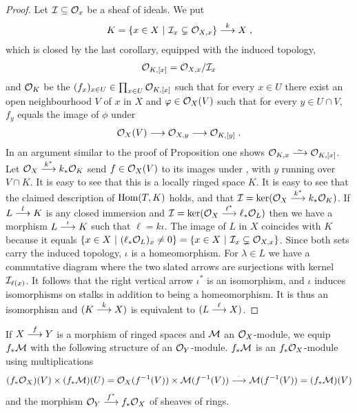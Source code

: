 \documentclass[a4paper,parskip=half,numbers=enddot, DIV=12]{scrreprt}
\begin{document}
\begin{proof}
    Let $\mathcal{I}\subseteq \mathcal{O}_x$ be a sheaf of ideals. We put 
    \begin{align*}
        K = \left\{x\in X\st\Ii_x\subsetneq \Oo_{X,x}\right\} \morphism[k] X\;,
    \end{align*}
    which is closed by the last corollary, equipped with the induced topology, 
    \begin{align*}
        \mathcal{O}_{K,[x]} = \mathcal{O}_{X,x} / \mathcal{I}_x
    \end{align*}
    and $\mathcal{O}_K$ be the $(f_x)_{x\in U}\in \prod_{x\in U}\mathcal{O}_{K,[x]}$ such that for every $x\in U$ there exist an open neighbourhood $V$ of $x$ in $X$ and $\varphi\in \mathcal{O}_X(V)$ such that for every $y\in U\cap V$, $f_y$ equals the image of $\phi$ under 
    \begin{align}\lbl{eq:stalkProj1.3.4}
        \Oo_X(V) \morphism \Oo_{X,y} \morphism \Oo_{K,[y]}\;.
    \end{align}
    In an argument similar to the proof of Proposition  one shows $\Oo_{K,x}\isomorphism \Oo_{K,[x]}$. Let $\Oo_X \morphism[k^*]k_* \Oo_K$ send $f\in \mathcal{O}_X(V)$ to its images under , with $y$ running over $V\cap K$. It is easy to see that this is a locally ringed space $K$. It is easy to see that the claimed description of $\operatorname{Hom}(T,K)$ holds, and that $\Ii = \ker(\Oo_X \morphism[k^*] k_* \Oo_K)$. If $L\morphism[\ell] K$ is any closed immersion and $\Ii= \ker (\Oo_X \morphism[\ell^*] \ell_* \Oo_L)$ then we have a morphism $L \morphism[\iota] K$ such that $\ell = k\iota$. The image of $L$ in $X$ coincides with $K$ because it equals $\left\{ x\in X\ \middle|\  (\ell_*\mathcal{O}_L)_x \neq 0\right\} = \left\{ x\in X\ \middle|\  \mathcal{I}_x \subsetneq \mathcal{O}_{X,x}\right\}$. Since both sets carry the induced topology, $\iota$ is a homeomorphism. For $\lambda \in L$ we have a commutative diagram where the two slated arrows are surjections with kernel $\mathcal{I}_{\ell(x)}$. It follows that the right vertical arrow $\iota^*$ is an isomorphism, and $\iota$ induces isomorphisms on stalks in addition to being a homeomorphism. It is thus an isomorphism and $(K\morphism[k] X)$ is equivalent to $(L\morphism[\ell] X)$.
\end{proof}
\begin{defi}
    If $X\morphism[f] Y$ is a morphism of ringed spaces and $\mathcal{M}$ an $\mathcal{O}_X$-module, we equip $f_* \mathcal{M}$ with the following structure of an $\mathcal{O}_Y$-module. $f_*\mathcal{M}$ is an $f_*\mathcal{O}_X$-module using multiplications
    \begin{align*}
        (f_*\Oo_X)(V)\times (f_*\Mm)(U)  = \Oo_X(f^{-1}(V))\times \Mm(f^{-1}(V)) \morphism[\cdot] \Mm(f^{-1}(V)) = (f_*\Mm)(V)
    \end{align*}
    and the morphism $\Oo_Y\morphism[f^*] f_* \Oo_X$ of sheaves of rings.
\end{defi}
\end{document}
